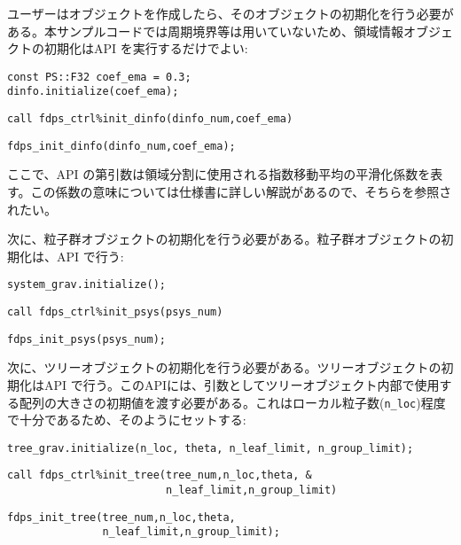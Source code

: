 ユーザーはオブジェクトを作成したら、そのオブジェクトの初期化を行う必要がある。本サンプルコードでは周期境界等は用いていないため、領域情報オブジェクトの初期化はAPI \initDinfo を実行するだけでよい:
\ifCpp%
\begin{lstlisting}[caption=領域クラスの初期化]
const PS::F32 coef_ema = 0.3;
dinfo.initialize(coef_ema);
\end{lstlisting}
\endifCpp
\ifFtn%
\begin{lstlisting}[caption=領域オブジェクトの初期化]
call fdps_ctrl%init_dinfo(dinfo_num,coef_ema)
\end{lstlisting}
\endifFtn
\ifC%
\begin{lstlisting}[caption=領域オブジェクトの初期化]
fdps_init_dinfo(dinfo_num,coef_ema);
\end{lstlisting}
\endifC
ここで、API \initDinfo の第引数は領域分割に使用される指数移動平均の平滑化係数を表す。この係数の意味については仕様書に詳しい解説があるので、そちらを参照されたい。

次に、粒子群オブジェクトの初期化を行う必要がある。粒子群オブジェクトの初期化は、API \initPsys で行う:
\ifCpp%
\begin{lstlisting}[caption=粒子群クラスの初期化]
system_grav.initialize();
\end{lstlisting}
\endifCpp
\ifFtn%
\begin{lstlisting}[caption=粒子群オブジェクトの初期化]
call fdps_ctrl%init_psys(psys_num)
\end{lstlisting}
\endifFtn
\ifC%
\begin{lstlisting}[caption=粒子群オブジェクトの初期化]
fdps_init_psys(psys_num);
\end{lstlisting}
\endifC

次に、ツリーオブジェクトの初期化を行う必要がある。ツリーオブジェクトの初期化はAPI \initTree で行う。このAPIには、引数としてツリーオブジェクト内部で使用する配列の大きさの初期値を渡す必要がある。これはローカル粒子数(\texttt{n\_loc})程度で十分であるため、そのようにセットする:
\ifCpp%
\begin{lstlisting}[caption=相互作用ツリークラスの初期化]
tree_grav.initialize(n_loc, theta, n_leaf_limit, n_group_limit);
\end{lstlisting}
\endifCpp
\ifFtn%
\begin{lstlisting}[caption=ツリーオブジェクトの初期化]
call fdps_ctrl%init_tree(tree_num,n_loc,theta, &
                         n_leaf_limit,n_group_limit)
\end{lstlisting}
\endifFtn
\ifC%
\begin{lstlisting}[caption=ツリーオブジェクトの初期化]
fdps_init_tree(tree_num,n_loc,theta,
               n_leaf_limit,n_group_limit);
\end{lstlisting}
\endifC

